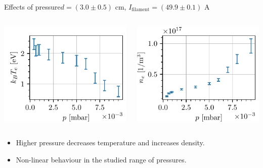 \documentclass[10pt]{beamer}
\newcommand{\filamentcurrent}{\ensuremath{I_{\mathrm{filament}}}}
\begin{document}
\begin{frame}{Effects of pressure}{$d = (3.0 \pm 0.5)$ cm, $\filamentcurrent = (49.9 \pm 0.1)$ A}

    \begin{columns}
        \centering
        {\includegraphics[scale=1]{../figures/temperatureeV_pressure.pdf}}


        \centering
        {\includegraphics[scale=1]{../figures/density_pressure.pdf}}

    \end{columns}
    \begin{itemize}
        \vspace{0.5cm}
        \item Higher pressure decreases temperature and increases density.
        \item Non-linear behaviour in the studied range of pressures.
    \end{itemize}
\end{frame}
\end{document}
